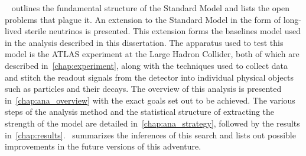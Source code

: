 ~ outlines the fundamental structure of the Standard Model and lists the open problems that plague it. An extension to the Standard Model in the form of long-lived sterile neutrinos is presented. This extension forms the baselines model used in the analysis described in this dissertation. The apparatus used to test this model is the ATLAS experiment at the Large Hadron Collider, both of which are described in~\cref{chap:experiment}, along with the techniques used to collect data and stitch the readout signals from the detector into individual physical objects such as particles and their decays. The overview of this analysis is presented in~\cref{chap:ana_overview} with the exact goals set out to be achieved. The various steps of the analysis method and the statistical structure of extracting the strength of the model are detailed in~\cref{chap:ana_strategy}, followed by the results in~\cref{chap:results}.~ summarizes the inferences of this search and lists out possible improvements in the future versions of this adventure.